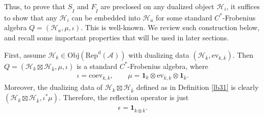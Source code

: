 \documentclass[12pt,a4paper]{article}
\theoremstyle{definition}
\theoremstyle{plain}
\newcommand{\mc}{\mathcal}
\newcommand{\wtd}{\widetilde}
\newcommand{\ovl}{\overline}
\newcommand{\id}{\mathbf{1}}
\newcommand{\ev}{\mathrm{ev}}
\newcommand{\coev}{\mathrm{coev}}
\newcommand{\RepdA}{\mathrm{Rep}^{\mathrm d}(\mc A)}
\newcommand{\Obj}{\mathrm{Obj}}
\numberwithin{equation}{section}
\begin{document}
Thus, to prove that $S_{\wtd I}$ and $F_{\wtd I}$ are preclosed on any dualized object $\mc H_i$, it suffices to show that any $\mc H_i$ can be embedded into $\mc H_a$  for some standard $C^*$-Frobenius algebra $Q=(\mc H_a,\mu,\iota)$. This is well-known. We review such construction below, and recall some important properties that will be used in later sections.



First, assume $\mc H_k\in\Obj(\RepdA)$ with dualizing data $(\mc H_{\ovl k},\ev_{k,\ovl k})$.  Then $Q=(\mc H_k\boxtimes\mc H_{\ovl k},\mu,\iota)$ is a standard  $C^*$-Frobenius algebra, where
\begin{align}
	\iota=\coev_{k,\ovl k},\qquad \mu=\id_k\otimes\ev_{\ovl k,k}\otimes\id_{\ovl k}.\label{eq49}
\end{align}
Moreover, the dualizing data of $\mc H_k\boxtimes\mc H_{\ovl k}$ defined as in  Definition \ref{lb31} is clearly $(\mc H_k\boxtimes\mc H_{\ovl k},\iota^*\mu)$. Therefore, the reflection operator is just
\begin{align*}
	\epsilon=\id_{k\otimes\ovl k}.
\end{align*}
\end{document}
